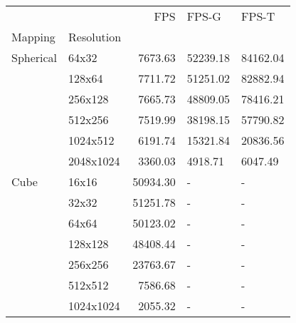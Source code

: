 \begin{tabular}{llrll}
\toprule
     &           &      FPS &    FPS-G &    FPS-T \\
Mapping & Resolution &          &          &          \\
\midrule
Spherical & 64x32 &  7673.63 & 52239.18 & 84162.04 \\
     & 128x64 &  7711.72 & 51251.02 & 82882.94 \\
     & 256x128 &  7665.73 & 48809.05 & 78416.21 \\
     & 512x256 &  7519.99 & 38198.15 & 57790.82 \\
     & 1024x512 &  6191.74 & 15321.84 & 20836.56 \\
     & 2048x1024 &  3360.03 &  4918.71 &  6047.49 \\
Cube & 16x16 & 50934.30 &        - &        - \\
     & 32x32 & 51251.78 &        - &        - \\
     & 64x64 & 50123.02 &        - &        - \\
     & 128x128 & 48408.44 &        - &        - \\
     & 256x256 & 23763.67 &        - &        - \\
     & 512x512 &  7586.68 &        - &        - \\
     & 1024x1024 &  2055.32 &        - &        - \\
\bottomrule
\end{tabular}
